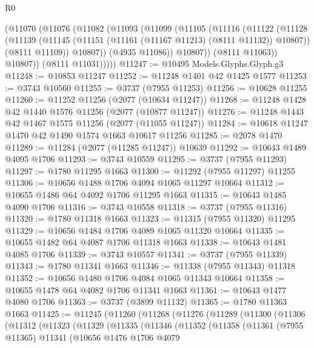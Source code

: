 \begin{lexlean}{R0}
\begin{coremodule}
          (@11070
            (@11076
              (@11082
                (@11093
                  (@11099
                    (@11105
                      (@11116
                        (@11122
                          (@11128
                            (@11139
                              (@11145 (@11151 (@11161 (@11167 @11213) (@8111 @11132)) @10807))
                              (@8111 @11109))
                            @10807))
                        (@4935 @11086))
                      @10807))
                  (@8111 @11063))
                @10807))
            (@8111 @11031)))))
@11247 := @10495 Models.Glyphs.Glyph.g3
@11248 := @10853 @11247
@11252 := @11248 @1401 @42 @1425 @1577
@11253 := @3743 @10560
@11255 := @3737 (@7955 @11253)
@11256 := @10628 @11255
@11260 := @11252 @11256 (@2077 (@10634 @11247))
@11268 := @11248 @1428 @42 @1440 @1576 @11256 (@2077 (@10877 @11247))
@11276 := @11248 @1443 @42 @1467 @1575 @11256 (@2077 (@11055 @11247))
@11284 := @10618 @11247 @1470 @42 @1490 @1574 @1663 @10617 @11256
@11285 := @2078 @1470
@11289 := @11284 (@2077 (@11285 @11247)) @10639
@11292 := @10643 @1489 @4095 @1706
@11293 := @3743 @10559
@11295 := @3737 (@7955 @11293)
@11297 := @1780 @11295 @1663
@11300 := @11292 (@7955 @11297) @11255
@11306 := @10656 @1488 @1706 @4094 @1065 @11297 @10664
@11312 := @10655 @1486 @64 @4092 @1706 @11295 @1663
@11315 := @10643 @1485 @4090 @1706
@11316 := @3743 @10558
@11318 := @3737 (@7955 @11316)
@11320 := @1780 @11318 @1663
@11323 := @11315 (@7955 @11320) @11295
@11329 := @10656 @1484 @1706 @4089 @1065 @11320 @10664
@11335 := @10655 @1482 @64 @4087 @1706 @11318 @1663
@11338 := @10643 @1481 @4085 @1706
@11339 := @3743 @10557
@11341 := @3737 (@7955 @11339)
@11343 := @1780 @11341 @1663
@11346 := @11338 (@7955 @11343) @11318
@11352 := @10656 @1480 @1706 @4084 @1065 @11343 @10664
@11358 := @10655 @1478 @64 @4082 @1706 @11341 @1663
@11361 := @10643 @1477 @4080 @1706
@11363 := @3737 (@3899 @11132)
@11365 := @1780 @11363 @1663
@11425 := @11245
    (@11260
      (@11268
        (@11276
          (@11289
            (@11300
              (@11306
                (@11312
                  (@11323
                    (@11329
                      (@11335
                        (@11346
                          (@11352
                            (@11358
                              (@11361
                                (@7955 @11365)
                                @11341
                                (@10656
                                  @1476
                                  @1706
                                  @4079

\end{coremodule}
\end{lexlean}
